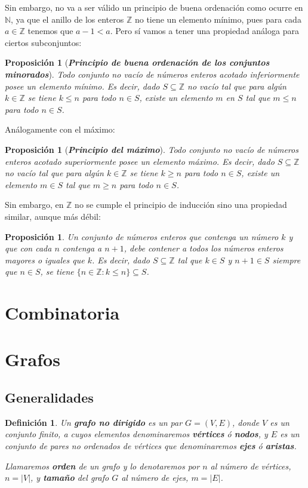 \documentclass[12pt]{article}
\newtheorem{proposition}[theorem]{Proposición}
\newtheorem{definition}[theorem]{Definición}
\begin{document}
Sin embargo, no va a ser válido un principio de buena ordenación como ocurre en $\mathbb{N}$, ya que el anillo de los enteros $\mathbb{Z}$ no tiene un elemento mínimo, pues para cada $a \in \mathbb{Z}$ tenemos que $a-1 < a$. Pero sí vamos a tener una propiedad análoga para ciertos subconjuntos:

\begin{proposition}[\textbf{\textit{Principio de buena ordenación de los conjuntos minorados}}]Todo conjunto no vacío de números enteros acotado inferiormente posee un elemento mínimo. Es decir, dado $S \subseteq \mathbb{Z}$ no vacío tal que para algún $k \in \mathbb{Z}$ se tiene $k \leq n$ para todo $n \in S$, existe un elemento $m$ en $S$ tal que $m \leq n$ para todo $n\in S$.
\end{proposition}

Análogamente con el máximo: 

\begin{proposition}[\textbf{\textit{Principio del máximo}}]Todo conjunto no vacío de números enteros acotado superiormente posee un elemento máximo. Es decir, dado $S \subseteq \mathbb{Z}$ no vacío tal que para algún $k \in \mathbb{Z}$ se tiene $k \geq n$ para todo $n \in S$, existe un elemento $m \in S$ tal que $m \geq n$ para todo $n \in S$.
\end{proposition}

Sin embargo, en $\mathbb{Z}$ no se cumple el principio de inducción sino una propiedad similar, aunque más débil:

\begin{proposition}Un conjunto de números enteros que contenga un número $k$ y que con cada $n$ contenga a $n+1$, debe contener a todos los números enteros mayores o iguales que $k$. Es decir, dado $S \subseteq \mathbb{Z}$ tal que $k \in S$ y $n+1 \in S$ siempre que $n \in S$, se tiene $\lbrace n \in \mathbb{Z}: k\leq n \rbrace \subseteq S$.
\end{proposition}

\section{Combinatoria}
\section{Grafos}
\subsection{Generalidades}
\begin{definition} Un \textbf{grafo no dirigido} es un par $G = (V,E)$, donde $V$ es un conjunto finito, a cuyos elementos denominaremos \textbf{vértices} ó \textbf{nodos}, y $E$ es un conjunto de pares no ordenados de vértices que denominaremos \textbf{ejes} ó \textbf{aristas}.

Llamaremos \textbf{orden} de un grafo y lo denotaremos por $n$ al número de vértices, $n = |V|$, y \textbf{tamaño} del grafo $G$ al número de ejes, $m = |E|$.
\end{definition}
\end{document}
